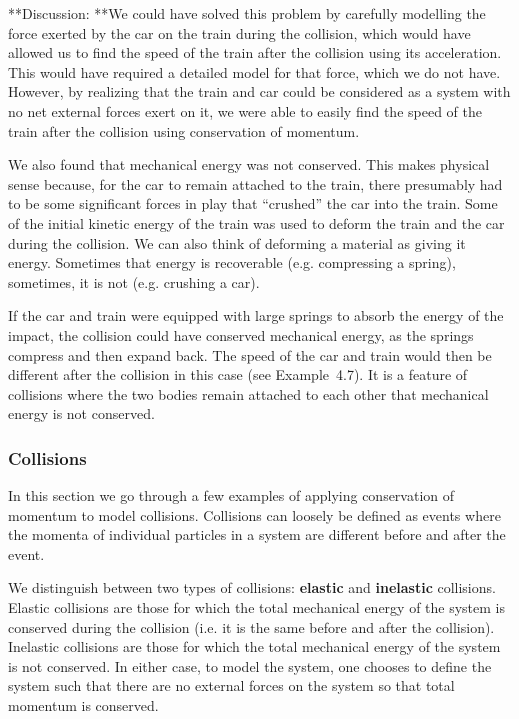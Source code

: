 \begin{framed}
\begin{framed}
**Discussion: **We could have solved this problem by carefully modelling the force exerted by the car on the train during the collision, which would have allowed us to find the speed of the train after the collision using its acceleration. This would have required a detailed model for that force, which we do not have. However, by realizing that the train and car could be considered as a system with no net external forces exert on it, we were able to easily find the speed of the train after the collision using conservation of momentum.

We also found that mechanical energy was not conserved. This makes physical sense because, for the car to remain attached to the train, there presumably had to be some significant forces in play that ``crushed'' the car into the train. Some of the initial kinetic energy of the train was used to deform the train and the car during the collision. We can also think of deforming a material as giving it energy. Sometimes that energy is recoverable (e.g. compressing a spring), sometimes, it is not (e.g. crushing a car).

If the car and train were equipped with large springs to absorb the energy of the impact, the collision could have conserved mechanical energy, as the springs compress and then expand back. The speed of the car and train would then be different after the collision in this case (see Example~4.7). It is a feature of collisions where the two bodies remain attached to each other that mechanical energy is not conserved.
\end{framed}
\end{framed}

\subsubsection{Collisions}

In this section we go through a few examples of applying conservation of momentum to model collisions. Collisions can loosely be defined as events where the momenta of individual particles in a system are different before and after the event.

We distinguish between two types of collisions: \textbf{elastic} and \textbf{inelastic} collisions. Elastic collisions are those for which the total mechanical energy of the system is conserved during the collision (i.e. it is the same before and after the collision). Inelastic collisions are those for which the total mechanical energy of the system is not conserved. In either case, to model the system, one chooses to define the system such that there are no external forces on the system so that total momentum is conserved.

